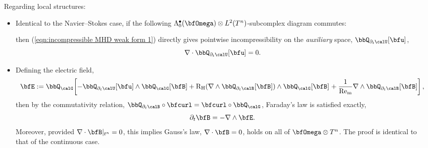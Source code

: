     Regarding local structures:
    \begin{itemize}
        \item  Identical to the Navier--Stokes case, if the following $\Lambda_{0}^{\bullet}(\bfOmega)\otimes L^{2}(T^{n})$-subcomplex diagram commutes:
        \begin{center}\end{center}
        then (\ref{eqn:incompressible MHD weak form 1}) directly gives pointwise incompressibility on the \emph{auxiliary} space, $\bbQ_{\partial_{t}\calU}[\bfu]$,
        \begin{equation}
            \nabla\cdot\bbQ_{\partial_{t}\calU}[\bfu]  =  0.
        \end{equation}

        \item  Defining the electric field,
        \begin{equation}
            \bfE
            :=  \bbQ_{\calG}\!\left[- \bbQ_{\partial_{t}\calU}[\bfu]\wedge\bbQ_{\calG}[\bfB]
            + \rmRH(\nabla\wedge\bbQ_{\partial_{t}\calB}[\bfB])\wedge\bbQ_{\calG}[\bfB]\tall
            + \frac{1}{\rmRem}\nabla\wedge\bbQ_{\partial_{t}\calB}[\bfB]\right],
        \end{equation}
        then by the commutativity relation, $\bbQ_{\partial_{t}\calB}\circ\bfcurl = \bfcurl\circ\bbQ_{\calG}$, Faraday's law is satisfied exactly,
        \begin{equation}
            \partial_{t}\bfB  =  - \nabla\wedge\bfE.
        \end{equation}
        Moreover, provided $\nabla\cdot\bfB|_{t^{n}} = 0$, this implies Gauss's law, $\nabla\cdot\bfB = 0$, holds on all of $\bfOmega\otimes T^{n}$. The proof is identical to that of the continuous case.
    \end{itemize}

